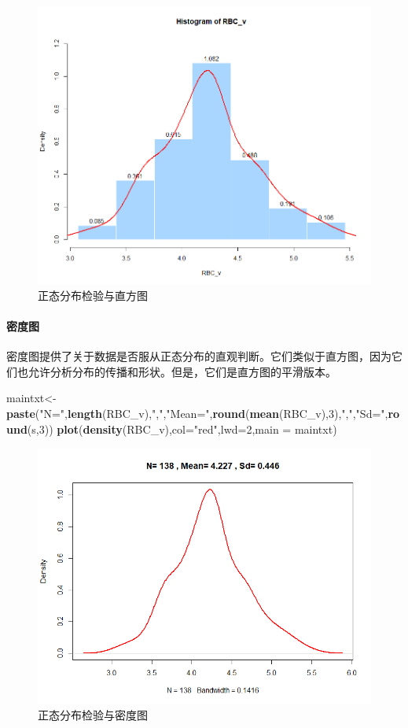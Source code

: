 \documentclass[
]{article}
\newenvironment{Shaded}{\begin{snugshade}}{\end{snugshade}}
\newcommand{\DataTypeTok}[1]{\textcolor[rgb]{0.13,0.29,0.53}{#1}}
\newcommand{\DecValTok}[1]{\textcolor[rgb]{0.00,0.00,0.81}{#1}}
\newcommand{\KeywordTok}[1]{\textcolor[rgb]{0.13,0.29,0.53}{\textbf{#1}}}
\newcommand{\NormalTok}[1]{#1}
\newcommand{\StringTok}[1]{\textcolor[rgb]{0.31,0.60,0.02}{#1}}
\begin{document}
\begin{figure}

{\centering \includegraphics[width=0.49\linewidth,height=0.49\textheight]{image/5ba23e818daa7c71b147707f9b5dfd6} 

}

\caption{正态分布检验与直方图}\label{fig:histtest}
\end{figure}

\hypertarget{ux5bc6ux5ea6ux56fe}{%
\paragraph{密度图}\label{ux5bc6ux5ea6ux56fe}}

密度图提供了关于数据是否服从正态分布的直观判断。它们类似于直方图，因为它们也允许分析分布的传播和形状。但是，它们是直方图的平滑版本。

\begin{Shaded}
\begin{Highlighting}[]
\NormalTok{maintxt<-}\KeywordTok{paste}\NormalTok{(}\StringTok{"N="}\NormalTok{,}\KeywordTok{length}\NormalTok{(RBC_v),}\StringTok{","}\NormalTok{,}\StringTok{"Mean="}\NormalTok{,}\KeywordTok{round}\NormalTok{(}\KeywordTok{mean}\NormalTok{(RBC_v),}\DecValTok{3}\NormalTok{),}\StringTok{","}\NormalTok{,}\StringTok{"Sd="}\NormalTok{,}\KeywordTok{round}\NormalTok{(s,}\DecValTok{3}\NormalTok{))}
\KeywordTok{plot}\NormalTok{(}\KeywordTok{density}\NormalTok{(RBC_v),}\DataTypeTok{col=}\StringTok{"red"}\NormalTok{,}\DataTypeTok{lwd=}\DecValTok{2}\NormalTok{,}\DataTypeTok{main =}\NormalTok{ maintxt)}
\end{Highlighting}
\end{Shaded}

\begin{figure}

{\centering \includegraphics[width=0.49\linewidth,height=0.49\textheight]{image/Densitytest} 

}

\caption{正态分布检验与密度图}\label{fig:densitytest}
\end{figure}
\end{document}
